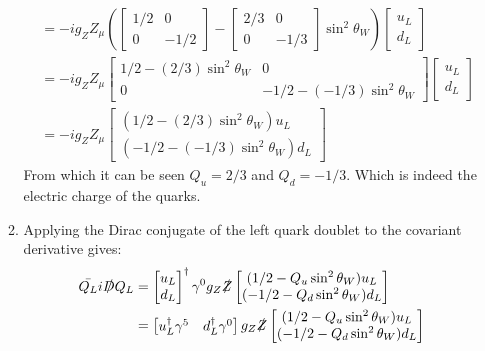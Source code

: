 \documentclass[12pt,a4]{article}
\begin{document}
\begin{enumerate}
\begin{enumerate}
\begin{align*}
                     &= - ig_Z Z_\mu \left(\left[\begin{matrix} 1/2 & 0 \\ 0 & -1/2\end{matrix}\right] - \left[\begin{matrix} 2/3 & 0 \\ 0 & -1/3 \end{matrix}\right]  \sin^2 \theta_W\right) \left[\begin{matrix} u_L \\ d_L\end{matrix}\right]\\
                     &= - ig_Z Z_\mu \left[\begin{matrix} 1/2 - (2 / 3)\sin^2 \theta_W& 0 \\ 0 & -1/2 - (-1/3)\sin^2 \theta_W\end{matrix}\right]  \left[\begin{matrix} u_L \\ d_L\end{matrix}\right]\\
                     &= - ig_Z Z_\mu \left[\begin{matrix} (1/2 - (2 / 3)\sin^2 \theta_W) u_L \\ (-1/2 - (-1/3) \sin^2 \theta_W) d_L \end{matrix}  \right] 
        \end{align*}
        From which it can be seen $Q_u = 2 / 3$ and $Q_d = - 1 / 3$.
        Which is indeed the electric charge of the quarks.
      \item
        Applying the Dirac conjugate of the left quark doublet to the covariant derivative gives:
        \begin{align*}
          \bar{Q_L} i \slashed{D} Q_L &= \left[\begin{matrix} u_L \\ d_L\end{matrix}\right]^\dagger \gamma^0 g_Z \slashed{Z} \left[\begin{matrix} (1/2 - Q_u\sin^2 \theta_W) u_L \\ (-1/2 - Q_d \sin^2 \theta_W) d_L \end{matrix}  \right] \\
                                      &= \left[\begin{matrix} u_L^\dagger\gamma^5 & d_L^\dagger \gamma^0 \end{matrix}\right]  g_Z \slashed{Z} \left[\begin{matrix} (1/2 - Q_u\sin^2 \theta_W) u_L \\ (-1/2 - Q_d \sin^2 \theta_W) d_L \end{matrix}  \right] \\

\end{align*}
\end{enumerate}
\end{enumerate}
\end{document}
